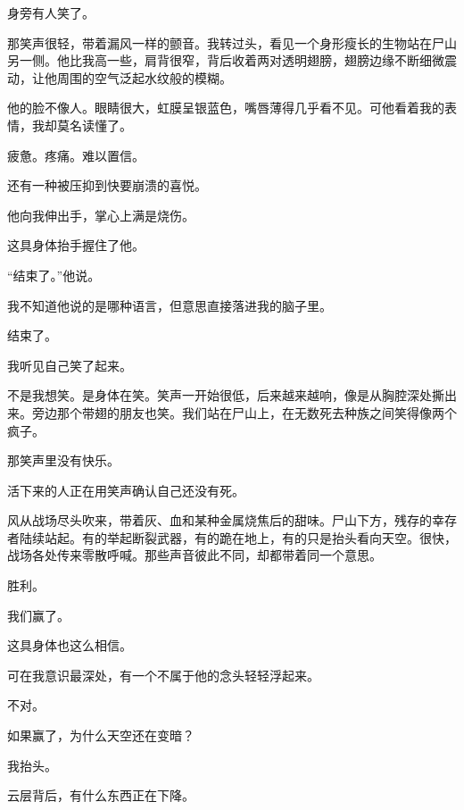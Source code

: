 身旁有人笑了。

那笑声很轻，带着漏风一样的颤音。我转过头，看见一个身形瘦长的生物站在尸山另一侧。他比我高一些，肩背很窄，背后收着两对透明翅膀，翅膀边缘不断细微震动，让他周围的空气泛起水纹般的模糊。

他的脸不像人。眼睛很大，虹膜呈银蓝色，嘴唇薄得几乎看不见。可他看着我的表情，我却莫名读懂了。

疲惫。疼痛。难以置信。

还有一种被压抑到快要崩溃的喜悦。

他向我伸出手，掌心上满是烧伤。

这具身体抬手握住了他。

“结束了。”他说。

我不知道他说的是哪种语言，但意思直接落进我的脑子里。

结束了。

我听见自己笑了起来。

不是我想笑。是身体在笑。笑声一开始很低，后来越来越响，像是从胸腔深处撕出来。旁边那个带翅的朋友也笑。我们站在尸山上，在无数死去种族之间笑得像两个疯子。

那笑声里没有快乐。

活下来的人正在用笑声确认自己还没有死。

风从战场尽头吹来，带着灰、血和某种金属烧焦后的甜味。尸山下方，残存的幸存者陆续站起。有的举起断裂武器，有的跪在地上，有的只是抬头看向天空。很快，战场各处传来零散呼喊。那些声音彼此不同，却都带着同一个意思。

胜利。

我们赢了。

这具身体也这么相信。

可在我意识最深处，有一个不属于他的念头轻轻浮起来。

不对。

如果赢了，为什么天空还在变暗？

我抬头。

云层背后，有什么东西正在下降。
